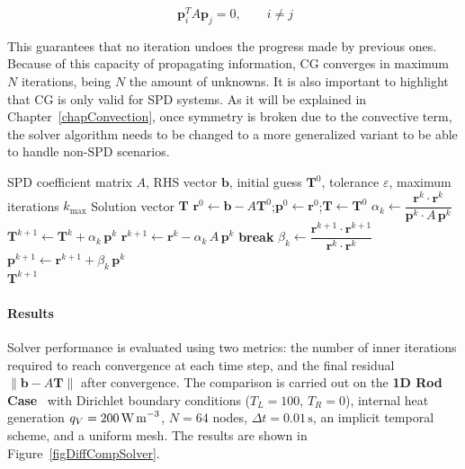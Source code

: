 \begin{equation}~\label{eqSolverCG}
    \mathbf{p}^T_i A \mathbf{p}_j = 0, \qquad i \neq j
\end{equation}

This guarantees that no iteration undoes the progress made by previous ones. Because of this capacity of propagating information, CG converges in maximum $N$ iterations, being $N$ the amount of unknowns. It is also important to highlight that CG is only valid for SPD systems. As it will be explained in Chapter~\ref{chapConvection}, once symmetry is broken due to the convective term, the solver algorithm needs to be changed to a more generalized variant to be able to handle non-SPD scenarios.

\begin{algorithm}[ht]
\caption{Conjugate Gradient solver}
\label{algCG}
\begin{algorithmic}[1]
    \Require SPD coefficient matrix $A$, RHS vector $\mathbf{b}$, initial guess $\mathbf{T}^0$, tolerance $\varepsilon$, maximum iterations $k_{\max}$
    \Ensure Solution vector $\mathbf{T}$
    \State $\mathbf{r}^0 \gets \mathbf{b} - A\mathbf{T}^0$;\quad $\mathbf{p}^0 \gets \mathbf{r}^0$;\quad $\mathbf{T} \gets \mathbf{T}^0$
        \State $\alpha_k \gets \dfrac{\mathbf{r}^k \cdot \mathbf{r}^k}{\mathbf{p}^k \cdot A\,\mathbf{p}^k}$
        \State $\mathbf{T}^{k+1} \gets \mathbf{T}^k + \alpha_k\,\mathbf{p}^k$
        \State $\mathbf{r}^{k+1} \gets \mathbf{r}^k - \alpha_k\, A\,\mathbf{p}^k$
            \State \textbf{break}
        \EndIf
        \State $\beta_k \gets \dfrac{\mathbf{r}^{k+1} \cdot \mathbf{r}^{k+1}}{\mathbf{r}^k \cdot \mathbf{r}^k}$
        \State $\mathbf{p}^{k+1} \gets \mathbf{r}^{k+1} + \beta_k\,\mathbf{p}^k$
    \EndFor \\
    \Return $\mathbf{T}^{k+1}$
\end{algorithmic}
\end{algorithm}


\paragraph{Results}
Solver performance is evaluated using two metrics: the number of inner iterations required to reach convergence at each time step, and the final residual $\|\mathbf{b} - A\mathbf{T}\|$ after convergence. The comparison is carried out on the \textbf{1D Rod Case}~\cite{CTTC2022Part1} with Dirichlet boundary conditions ($T_L = 100$, $T_R = 0$), internal heat generation $q_V = 200\,\text{W\,m}^{-3}$, $N = 64$ nodes, $\Delta t = 0.01\,\text{s}$, an implicit temporal scheme, and a uniform mesh. The results are shown in Figure~\ref{figDiffCompSolver}.

